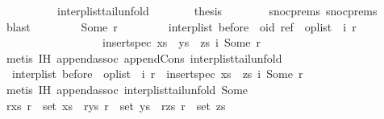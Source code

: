 \begin{isabellebody}
\ \ \ \ \ \ \ \ \ \ interp{\isacharunderscore}list{\isacharunderscore}tail{\isacharunderscore}unfold{\isacharparenright}\isanewline
\ \ \ \ \isamarkupfalse%
\ \isamarkupfalse%
\ {\isacharquery}thesis\isanewline
\ \ \ \ \ \ \isamarkupfalse%
\ snoc{\isachardot}prems{\isacharparenleft}{}{\isacharparenright}\ snoc{\isachardot}prems{\isacharparenleft}{}{\isacharparenright}\ \isamarkupfalse%
\ blast\isanewline
\ \ \isamarkupfalse%
\isanewline
\ \ \ \ \isamarkupfalse%
\ {\isacharparenleft}Some\ r{\isacharparenright}\isanewline
\ \ \ \ \isamarkupfalse%
\ \isamarkupfalse%
\ {}{\isacharcolon}\ {\isachardoublequoteopen}interp{\isacharunderscore}list\ {\isacharparenleft}before\ {\isacharat}\ {\isacharparenleft}oid{\isacharcomma}\ ref{\isacharparenright}\ {\isacharhash}\ op{\isacharunderscore}list\ {\isacharat}\ {\isacharbrackleft}{\isacharparenleft}i{}{\isacharcomma}\ r{}{\isacharparenright}{\isacharbrackright}{\isacharparenright}\ {\isacharequal}\isanewline
\ \ \ \ \ \ \ \ \ \ \ \ \ \ \ \ \ \ insert{\isacharunderscore}spec\ {\isacharparenleft}xs\ {\isacharat}\ ys\ {\isacharat}\ zs{\isacharparenright}\ {\isacharparenleft}i{}{\isacharcomma}\ Some\ r{\isacharparenright}{\isachardoublequoteclose}\isanewline
\ \ \ \ \ \ \isamarkupfalse%
\ {\isacharparenleft}metis\ IH{}\ append{\isachardot}assoc\ append{\isacharunderscore}Cons\ interp{\isacharunderscore}list{\isacharunderscore}tail{\isacharunderscore}unfold{\isacharparenright}\isanewline
\ \ \ \ \isamarkupfalse%
\ {}{\isacharcolon}\ {\isachardoublequoteopen}interp{\isacharunderscore}list\ {\isacharparenleft}before\ {\isacharat}\ op{\isacharunderscore}list\ {\isacharat}\ {\isacharbrackleft}{\isacharparenleft}i{}{\isacharcomma}\ r{}{\isacharparenright}{\isacharbrackright}{\isacharparenright}\ {\isacharequal}\ insert{\isacharunderscore}spec\ {\isacharparenleft}xs\ {\isacharat}\ zs{\isacharparenright}\ {\isacharparenleft}i{}{\isacharcomma}\ Some\ r{\isacharparenright}{\isachardoublequoteclose}\isanewline
\ \ \ \ \ \ \isamarkupfalse%
\ {\isacharparenleft}metis\ IH{}\ append{\isachardot}assoc\ interp{\isacharunderscore}list{\isacharunderscore}tail{\isacharunderscore}unfold\ Some{\isacharparenright}\isanewline
\ \ \ \ \isamarkupfalse%
\ {\isacharparenleft}r{\isacharunderscore}xs{\isacharparenright}\ {\isachardoublequoteopen}r\ {\isasymin}\ set\ xs{\isachardoublequoteclose}\ {\isacharbar}\ {\isacharparenleft}r{\isacharunderscore}ys{\isacharparenright}\ {\isachardoublequoteopen}r\ {\isasymin}\ set\ ys{\isachardoublequoteclose}\ {\isacharbar}\ {\isacharparenleft}r{\isacharunderscore}zs{\isacharparenright}\ {\isachardoublequoteopen}r\ {\isasymin}\ set\ zs{\isachardoublequoteclose}\ {\isacharbar}\isanewline

\end{isabellebody}
